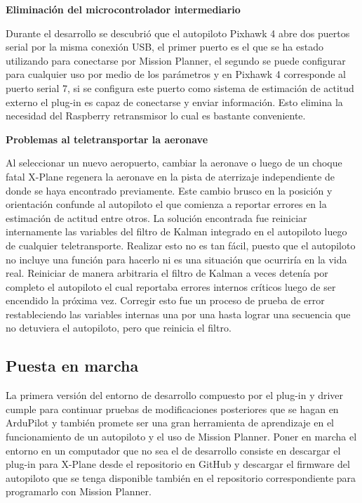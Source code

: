 \textbf{Eliminación del microcontrolador intermediario}

Durante el desarrollo se descubrió que el autopiloto Pixhawk 4 abre dos puertos serial por la misma conexión USB, el primer puerto es el que se ha estado utilizando para conectarse por Mission Planner, el segundo se puede configurar para cualquier uso por medio de los parámetros y en Pixhawk 4 corresponde al puerto serial 7, si se configura este puerto como sistema de estimación de actitud externo el plug-in es capaz de conectarse y enviar información. Esto elimina la necesidad del Raspberry retransmisor lo cual es bastante conveniente.

\textbf{Problemas al teletransportar la aeronave}

Al seleccionar un nuevo aeropuerto, cambiar la aeronave o luego de un choque fatal X-Plane regenera la aeronave en la pista de aterrizaje independiente de donde se haya encontrado previamente. Este cambio brusco en la posición y orientación confunde al autopiloto el que comienza a reportar errores en la estimación de actitud entre otros. La solución encontrada fue reiniciar internamente las variables del filtro de Kalman integrado en el autopiloto luego de cualquier teletransporte. Realizar esto no es tan fácil, puesto que el autopiloto no incluye una función para hacerlo ni es una situación que ocurriría en la vida real. Reiniciar de manera arbitraria el filtro de Kalman a veces detenía por completo el autopiloto el cual reportaba errores internos críticos luego de ser encendido la próxima vez. Corregir esto fue un proceso de prueba de error restableciendo las variables internas una por una hasta lograr una secuencia que no detuviera el autopiloto, pero que reinicia el filtro.

\subsection{Puesta en marcha}

La primera versión del entorno de desarrollo compuesto por el plug-in y driver cumple para continuar pruebas de modificaciones posteriores que se hagan en ArduPilot y también promete ser una gran herramienta de aprendizaje en el funcionamiento de un autopiloto y el uso de Mission Planner. Poner en marcha el entorno en un computador que no sea el de desarrollo consiste en descargar el plug-in para X-Plane desde el repositorio en GitHub \cite{xplane-hitl-plugin} y descargar el firmware del autopiloto que se tenga disponible también en el repositorio correspondiente \cite{ap-hitl-fork} para programarlo con Mission Planner.